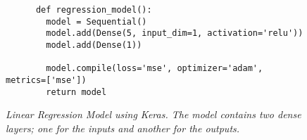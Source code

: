 \begin{figure}
  \begin{code}
    \begin{verbatim}
      def regression_model():
        model = Sequential()
        model.add(Dense(5, input_dim=1, activation='relu'))
        model.add(Dense(1))

        model.compile(loss='mse', optimizer='adam', metrics=['mse'])
        return model
    \end{verbatim}
    \caption{\textit{Linear Regression Model using Keras. The model contains two dense layers; one for the inputs and another for the outputs.}}
    \label{code:regression_model}
  \end{code}
\end{figure}